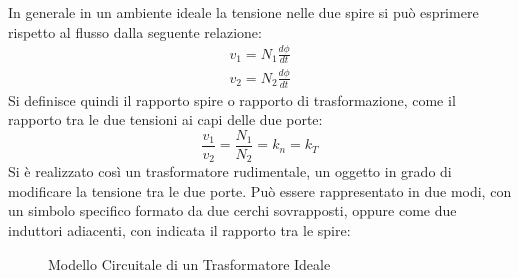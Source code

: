 \documentclass{article}
\numberwithin{equation}{subsection}
\begin{document}
In generale in un ambiente ideale la tensione nelle due spire si può esprimere rispetto al flusso dalla seguente relazione:
\begin{gather*}
    v_1=\displaystyle N_1\frac{d\phi}{dt}\\
    v_2=\displaystyle N_2\frac{d\phi}{dt}
\end{gather*}
Si definisce quindi il rapporto spire o rapporto di trasformazione, come il rapporto tra le due tensioni ai capi delle due porte:
\begin{equation}
    \displaystyle\frac{v_1}{v_2}=\frac{N_1}{N_2}=k_n=k_T
\end{equation}
Si è realizzato così un trasformatore rudimentale, un oggetto in grado di modificare la tensione tra le due porte. Può essere rappresentato in due modi, con un simbolo 
specifico formato da due cerchi sovrapposti, oppure come due induttori adiacenti, con indicata il rapporto tra le spire:
\begin{figure}[h!]%
    \centering
    \qquad
    \caption{Modello Circuitale di un Trasformatore Ideale}
    \label{fig:trasformatore-ideale}
\end{figure}
\end{document}
